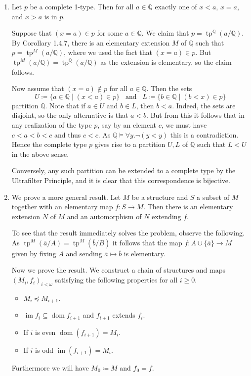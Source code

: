 \documentclass{article}
\theoremstyle{theorem}
\DeclareMathOperator{\tp}{tp}
\DeclareMathOperator{\dom}{dom}
\DeclareMathOperator{\im}{im}
\begin{document}
	\begin{enumerate}[leftmargin=*]
		\item Let $p$ be a complete 1-type. Then for all $a\in \mathbb{Q}$ exactly one of $x<a$, $x=a$, and $x>a$ is in $p$.
		
		Suppose that $(x=a)\in p$ for some $a\in\mathbb{Q}$. We claim that $p = \tp^\mathbb{Q}(a/\mathbb{Q})$. By Corollary 1.4.7, there is an elementary extension $M$ of $\mathbb{Q}$ such that $p = \tp^{M}(a/\mathbb{Q})$, where we used the fact that $(x=a)\in p$. But $\tp^{M}(a/\mathbb{Q})=\tp^\mathbb{Q}(a/\mathbb{Q})$ as the extension is elementary, so the claim follows.
		
		Now assume that $(x=a)\notin p$ for all $a\in\mathbb{Q}$. Then the sets
		\[
			U\coloneqq \{a\in\mathbb{Q}\mid (x<a)\in p\} \,\,\,\text{ and }\,\,\, L\coloneqq \{b\in\mathbb{Q} \mid (b<x)\in p\}
		\]
		partition $\mathbb{Q}$. Note that if $a\in U$ and $b\in L$, then $b<a$. Indeed, the sets are disjoint, so the only alternative is that $a<b$. But from this it follows that in any realization of the type $p$, say by an element $c$, we must have $c<a<b<c$ and thus $c<c$. As $\mathbb{Q}\models \forall y. \neg(y<y)$ this is a contradiction. Hence the complete type $p$ gives rise to a partition $U,L$ of $\mathbb{Q}$ such that $L<U$ in the above sense.
		
		Conversely, any such partition can be extended to a complete type by the Ultrafilter Principle, and it is clear that this correspondence is bijective.
		
		\item We prove a more general result. Let $M$ be a structure and $S$ a subset of $M$ together with an elementary map $f\colon S \to M$. Then there is an elementary extension $N$ of $M$ and an automorphism of $N$ extending $f$.
		
		To see that the result immediately solves the problem, observe the following. As $\tp^M(\bar{a}/A) = \tp^M(\bar{b}/B)$ it follows that the map $f\colon A\cup \{\bar{a}\} \to M$ given by fixing $A$ and sending $\bar{a}\mapsto \bar{b}$ is elementary.
		
		Now we prove the result. We construct a chain of structures and maps $(M_i,f_i)_{i<\omega}$ satisfying the following properties for all $i\geq 0$.
		\begin{itemize}
			\item $M_i\preccurlyeq M_{i+1}$.
			\item $\im f_i \subseteq \dom f_{i+1}$ and $f_{i+1}$ extends $f_i$.
			\item If $i$ is even $\dom(f_{i + 1}) = M_{i}$.
			\item If $i$ is odd $\im(f_{i + 1}) = M_{i}$.
		\end{itemize}
		Furthermore we will have $M_0 \coloneqq M$ and $f_0 =f$.
		

\end{enumerate}
\end{document}
